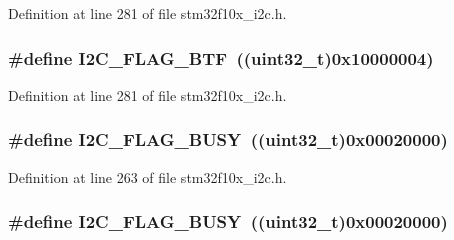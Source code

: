Definition at line 281 of file stm32f10x\+\_\+i2c.\+h.

\subsubsection[{\texorpdfstring{I2\+C\+\_\+\+F\+L\+A\+G\+\_\+\+B\+TF}{I2C_FLAG_BTF}}]{\setlength{\rightskip}{0pt plus 5cm}\#define I2\+C\+\_\+\+F\+L\+A\+G\+\_\+\+B\+TF~(({\bf uint32\+\_\+t})0x10000004)}\hypertarget{group___i2_c__flags__definition_ga4dc3d44342007a5cd21c3baa0d938606}{}\label{group___i2_c__flags__definition_ga4dc3d44342007a5cd21c3baa0d938606}


Definition at line 281 of file stm32f10x\+\_\+i2c.\+h.

\subsubsection[{\texorpdfstring{I2\+C\+\_\+\+F\+L\+A\+G\+\_\+\+B\+U\+SY}{I2C_FLAG_BUSY}}]{\setlength{\rightskip}{0pt plus 5cm}\#define I2\+C\+\_\+\+F\+L\+A\+G\+\_\+\+B\+U\+SY~(({\bf uint32\+\_\+t})0x00020000)}\hypertarget{group___i2_c__flags__definition_ga50f69f043d99600221076100823b6ff3}{}\label{group___i2_c__flags__definition_ga50f69f043d99600221076100823b6ff3}


Definition at line 263 of file stm32f10x\+\_\+i2c.\+h.

\subsubsection[{\texorpdfstring{I2\+C\+\_\+\+F\+L\+A\+G\+\_\+\+B\+U\+SY}{I2C_FLAG_BUSY}}]{\setlength{\rightskip}{0pt plus 5cm}\#define I2\+C\+\_\+\+F\+L\+A\+G\+\_\+\+B\+U\+SY~(({\bf uint32\+\_\+t})0x00020000)}\hypertarget{group___i2_c__flags__definition_ga50f69f043d99600221076100823b6ff3}{}\label{group___i2_c__flags__definition_ga50f69f043d99600221076100823b6ff3}


